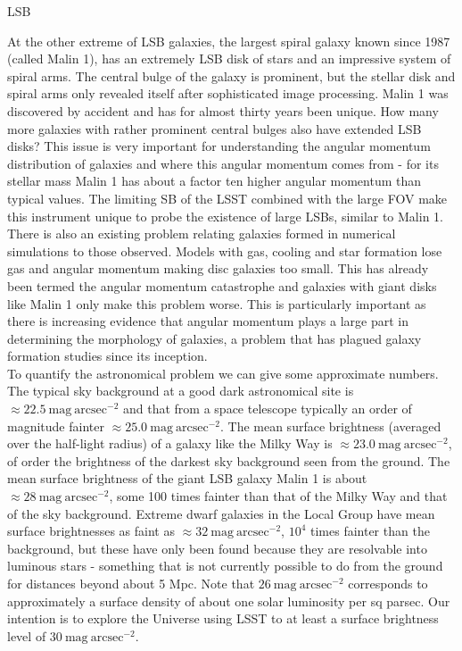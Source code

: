 {\begin{tasklist}{LSB}
\begin{task}
{At the other extreme of LSB galaxies, the largest spiral galaxy known since 1987 (called Malin 1), has an extremely LSB disk of stars and an impressive system of spiral arms. The central bulge of the galaxy is prominent, but the stellar disk and spiral arms only revealed itself after sophisticated image processing. Malin 1 was discovered by accident and has for almost thirty years been unique. How many more galaxies with rather prominent central bulges also have extended LSB disks? This issue is very important for understanding the angular momentum distribution of galaxies and where this angular momentum comes from - for its stellar mass Malin 1 has about a factor ten higher angular momentum than typical values. The limiting SB of the LSST combined with the large FOV make this instrument unique to probe the existence of large LSBs, similar to Malin 1. There is also an existing problem relating galaxies formed in numerical simulations to those observed. Models with gas, cooling and star formation lose gas and angular momentum making disc galaxies too small. This has already been termed the angular momentum catastrophe and galaxies with giant disks like Malin 1 only make this problem worse. This is particularly important as there is increasing evidence that angular momentum plays a large part in determining the morphology of galaxies, a problem that has plagued galaxy formation studies since its inception.  
\\
To quantify the astronomical problem we can give some approximate numbers. The typical sky background at a good dark astronomical site is $\approx22.5~\mathrm{mag}~\mathrm{arcsec}^{-2}$ and that from a space telescope typically an order of magnitude fainter $\approx25.0~\mathrm{mag}~\mathrm{arcsec}^{-2}$. The mean surface brightness (averaged over the half-light radius) of a galaxy like the Milky Way is $\approx23.0~\mathrm{mag}~\mathrm{arcsec}^{-2}$, of order the brightness of the darkest sky background seen from the ground. The mean surface brightness of the giant LSB galaxy Malin 1 is about $\approx28~\mathrm{mag}~\mathrm{arcsec}^{-2}$, some 100 times fainter than that of the Milky Way and that of the sky background. Extreme dwarf galaxies in the Local Group have mean surface brightnesses as faint as $\approx32~\mathrm{mag}~\mathrm{arcsec}^{-2}$, $10^4$ times fainter than the background, but these have only been found because they are resolvable into luminous stars - something that is not currently possible to do from the ground for distances beyond about 5 Mpc. Note that $26~\mathrm{mag}~\mathrm{arcsec}^{-2}$ corresponds to approximately a surface density of about one solar luminosity per sq parsec. Our intention is to explore the Universe using LSST to at least a surface brightness level of $30~\mathrm{mag}~\mathrm{arcsec}^{-2}$.
}
\end{task}
\end{tasklist}}
